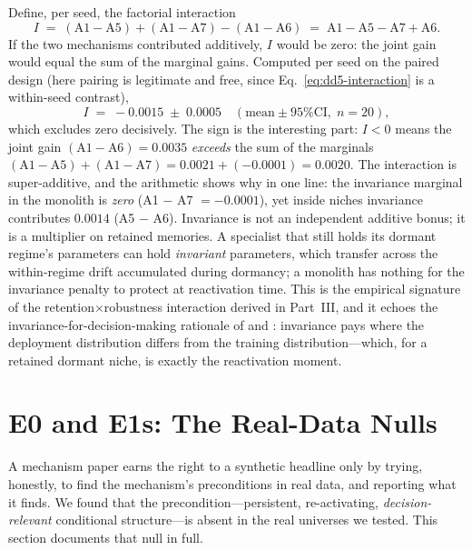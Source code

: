 \documentclass[11pt,a4paper]{article}
\theoremstyle{definition}
\theoremstyle{plain}
\begin{document}
Define, per seed, the factorial interaction
\begin{equation}
I \;=\; (\text{A1} - \text{A5}) + (\text{A1} - \text{A7})
- (\text{A1} - \text{A6})
\;=\; \text{A1} - \text{A5} - \text{A7} + \text{A6}.
\label{eq:dd5-interaction}
\end{equation}
If the two mechanisms contributed additively, $I$ would be zero: the joint
gain would equal the sum of the marginal gains. Computed per seed on the
paired design (here pairing is legitimate and free, since
Eq.~\eqref{eq:dd5-interaction} is a within-seed contrast),
\[
I \;=\; -0.0015 \;\pm\; 0.0005 \quad (\text{mean} \pm \text{95\% CI},\;
n = 20),
\]
which excludes zero decisively. The sign is the interesting part: $I < 0$
means the joint gain $(\text{A1}-\text{A6}) = 0.0035$ \emph{exceeds} the sum
of the marginals $(\text{A1}-\text{A5}) + (\text{A1}-\text{A7}) =
0.0021 + (-0.0001) = 0.0020$. The interaction is super-additive, and the
arithmetic shows why in one line: the invariance marginal in the monolith is
\emph{zero} (A1 $-$ A7 $= -0.0001$), yet inside niches invariance
contributes $0.0014$ (A5 $-$ A6). Invariance is not an independent additive
bonus; it is a multiplier on retained memories. A specialist that still
holds its dormant regime's parameters can hold \emph{invariant} parameters,
which transfer across the within-regime drift accumulated during dormancy;
a monolith has nothing for the invariance penalty to protect at
reactivation time. This is the empirical signature of the
retention$\times$robustness interaction derived in
Part~III, and it echoes the
invariance-for-decision-making rationale of \citet{krueger2021rex} and
\citet{yan2026invpnco}: invariance pays where the deployment distribution
differs from the training distribution---which, for a retained dormant
niche, is exactly the reactivation moment.

\section{E0 and E1s: The Real-Data Nulls}
\label{sec:dd5-e0e1s}

A mechanism paper earns the right to a synthetic headline only by trying,
honestly, to find the mechanism's preconditions in real data, and reporting
what it finds. We found that the precondition---persistent, re-activating,
\emph{decision-relevant} conditional structure---is absent in the real
universes we tested. This section documents that null in full.
\end{document}

